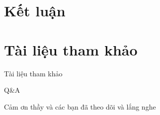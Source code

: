 \documentclass[notheorems, aspectratio=54]{beamer}
\begin{document}
\section{Kết luận}

\section{Tài liệu tham khảo}
\begin{frame}{Tài liệu tham khảo}
	\nocite{*}
	\newpage\cleardoublepage
	
\end{frame}


\begin{frame}{Q\&A}
	\begin{center}
		\Huge Cảm ơn thầy và các bạn đã theo dõi và lắng nghe
	\end{center}
\end{frame}
\end{document}
